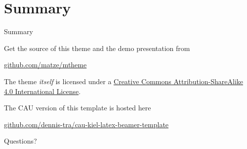 \section{Summary}

\begin{frame}{Summary}
	
	Get the source of this theme and the demo presentation from
	
	\begin{center}\url{github.com/matze/mtheme}\end{center}
	
	The theme \emph{itself} is licensed under a
	\href{http://creativecommons.org/licenses/by-sa/4.0/}{Creative Commons
	Attribution-ShareAlike 4.0 International License}.
	
	The CAU version of this template is hosted here
	\begin{center}\url{github.com/dennis-tra/cau-kiel-latex-beamer-template}\end{center}
\end{frame}

\begin{frame}[standout]
  Questions?
\end{frame}